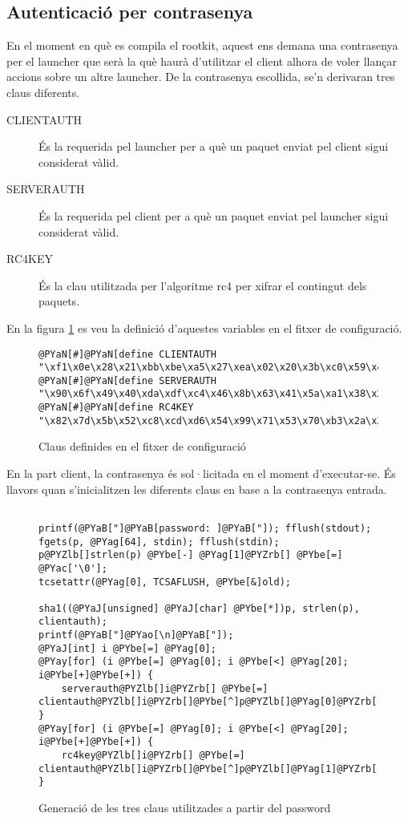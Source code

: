 \subsection{Autenticació per contrasenya}

En el moment en què es compila el rootkit, aquest ens demana una contrasenya per el launcher que serà la 
què haurà d'utilitzar el client alhora de voler llançar accions sobre un altre launcher. De la 
contrasenya escollida, se'n derivaran tres claus diferents. 

\begin{description}
    \item[CLIENTAUTH] És la requerida pel launcher per a què un paquet enviat pel client sigui considerat 
        vàlid.
    \item[SERVERAUTH] És la requerida pel client per a què un paquet enviat pel launcher sigui considerat
        vàlid.
    \item[RC4KEY] És la clau utilitzada per l'algoritme rc4 per xifrar el contingut dels paquets.
\end{description}

En la figura \ref{fig:config} es veu la definició d'aquestes variables en el fitxer de configuració.

\begin{figure}[h!]
\begin{Verbatim}[commandchars=@\[\]]
@PYaN[#]@PYaN[define CLIENTAUTH "\xf1\x0e\x28\x21\xbb\xbe\xa5\x27\xea\x02\x20\x3b\xc0\x59\x44\x51\x90"]
@PYaN[#]@PYaN[define SERVERAUTH "\x90\x6f\x49\x40\xda\xdf\xc4\x46\x8b\x63\x41\x5a\xa1\x38\x25\x30\xf1"]
@PYaN[#]@PYaN[define RC4KEY "\x82\x7d\x5b\x52\xc8\xcd\xd6\x54\x99\x71\x53\x70\xb3\x2a\x37\x22\xe3"]
\end{Verbatim}
\caption{Claus definides en el fitxer de configuració}
    \label{fig:config}
\end{figure}

En la part client, la contrasenya és sol·licitada en el moment d'executar-se. És llavors quan s'inicialitzen les 
diferents claus en base a la contrasenya entrada.

\begin{figure}[h!]
\begin{Verbatim}[commandchars=@\[\]]

printf(@PYaB["]@PYaB[password: ]@PYaB["]); fflush(stdout);
fgets(p, @PYag[64], stdin); fflush(stdin);
p@PYZlb[]strlen(p) @PYbe[-] @PYag[1]@PYZrb[] @PYbe[=] @PYac['\0'];
tcsetattr(@PYag[0], TCSAFLUSH, @PYbe[&]old);

sha1((@PYaJ[unsigned] @PYaJ[char] @PYbe[*])p, strlen(p), clientauth);
printf(@PYaB["]@PYao[\n]@PYaB["]);
@PYaJ[int] i @PYbe[=] @PYag[0];
@PYay[for] (i @PYbe[=] @PYag[0]; i @PYbe[<] @PYag[20]; i@PYbe[+]@PYbe[+]) {
    serverauth@PYZlb[]i@PYZrb[] @PYbe[=] clientauth@PYZlb[]i@PYZrb[]@PYbe[^]p@PYZlb[]@PYag[0]@PYZrb[];
}
@PYay[for] (i @PYbe[=] @PYag[0]; i @PYbe[<] @PYag[20]; i@PYbe[+]@PYbe[+]) {
    rc4key@PYZlb[]i@PYZrb[] @PYbe[=] clientauth@PYZlb[]i@PYZrb[]@PYbe[^]p@PYZlb[]@PYag[1]@PYZrb[];
}
\end{Verbatim}
    \caption{Generació de les tres claus utilitzades a partir del password}
    \label{fig:client_get_pass}
\end{figure}

